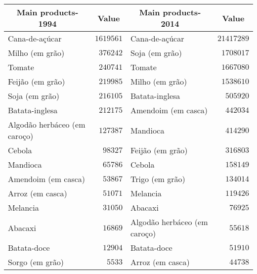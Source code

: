 \begin{table}[!tbp]
\begin{center}
\begin{tabular}{lrlr}
\hline\hline
\multicolumn{1}{c}{Main products-1994}&\multicolumn{1}{c}{Value}&\multicolumn{1}{c}{Main products-2014}&\multicolumn{1}{c}{Value}\tabularnewline
\hline
Cana-de-açúcar&$1619561$&Cana-de-açúcar&$21417289$\tabularnewline
Milho (em grão)&$ 376242$&Soja (em grão)&$ 1708017$\tabularnewline
Tomate&$ 240741$&Tomate&$ 1667080$\tabularnewline
Feijão (em grão)&$ 219985$&Milho (em grão)&$ 1538610$\tabularnewline
Soja (em grão)&$ 216105$&Batata-inglesa&$  505920$\tabularnewline
Batata-inglesa&$ 212175$&Amendoim (em casca)&$  442034$\tabularnewline
Algodão herbáceo (em caroço)&$ 127387$&Mandioca&$  414290$\tabularnewline
Cebola&$  98327$&Feijão (em grão)&$  316803$\tabularnewline
Mandioca&$  65786$&Cebola&$  158149$\tabularnewline
Amendoim (em casca)&$  53867$&Trigo (em grão)&$  134014$\tabularnewline
Arroz (em casca)&$  51071$&Melancia&$  119426$\tabularnewline
Melancia&$  31050$&Abacaxi&$   76925$\tabularnewline
Abacaxi&$  16869$&Algodão herbáceo (em caroço)&$   55618$\tabularnewline
Batata-doce&$  12904$&Batata-doce&$   51910$\tabularnewline
Sorgo (em grão)&$   5533$&Arroz (em casca)&$   44738$\tabularnewline
\hline
\end{tabular}\end{center}

\end{table}
